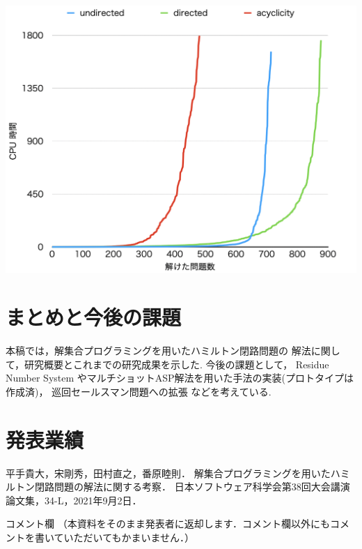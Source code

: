 \documentclass[a4j,10pt]{jarticle}
\begin{document}
\begin{multicols}{1}
{ \centering
 \includegraphics[width=1.0\linewidth]{cactus.png}\\
 \label{cactus}
}

\section{まとめと今後の課題}
本稿では，解集合プログラミングを用いたハミルトン閉路問題の
解法に関して，研究概要とこれまでの研究成果を示した. 
今後の課題として，
Residue Number System やマルチショットASP解法を用いた手法の実装(プロトタイプは作成済)，
巡回セールスマン問題への拡張
などを考えている.

\section{発表業績}
\noindent 平手貴大，宋剛秀，田村直之，番原睦則．
解集合プログラミングを用いたハミルトン閉路問題の解法に関する考察．
日本ソフトウェア科学会第38回大会講演論文集，34-L，2021年9月2日．



\end{multicols}
\vfill
\noindent
{\gt コメント欄}
{\footnotesize
（本資料をそのまま発表者に返却します．コメント欄以外にもコメントを書いていただいてもかまいません．）}
\\
\fbox{\begin{minipage}{\textwidth}\noindent\\\\\end{minipage}}	
\end{document}
